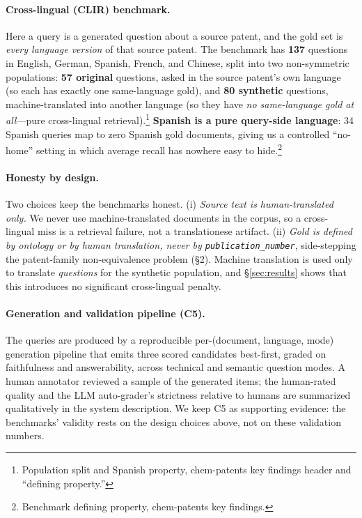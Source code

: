 \documentclass[11pt]{article}
\begin{document}
\paragraph{Cross-lingual (CLIR) benchmark.}
Here a query is a generated question about a source patent, and the gold set is
\emph{every language version} of that source patent. The benchmark has
\textbf{137} questions in English, German, Spanish, French, and Chinese, split
into two non-symmetric populations: \textbf{57 original} questions, asked in the
source patent's own language (so each has exactly one same-language gold), and
\textbf{80 synthetic} questions, machine-translated into another language (so
they have \emph{no same-language gold at all}---pure cross-lingual
retrieval).\footnote{Population split and Spanish property, chem-patents key
findings header and ``defining property.''} \textbf{Spanish is a pure
query-side language}: 34 Spanish queries map to zero Spanish gold documents,
giving us a controlled ``no-home'' setting in which average recall has nowhere
easy to hide.\footnote{Benchmark defining property, chem-patents key findings.}

\paragraph{Honesty by design.}
Two choices keep the benchmarks honest. (i) \emph{Source text is
human-translated only.} We never use machine-translated documents in the
corpus, so a cross-lingual miss is a retrieval failure, not a translationese
artifact. (ii) \emph{Gold is defined by ontology or by human translation, never
by \texttt{publication\_number}}, side-stepping the patent-family
non-equivalence problem (\S2). Machine translation is used only to translate
\emph{questions} for the synthetic population, and \S\ref{sec:results} shows
that this introduces no significant cross-lingual penalty.

\paragraph{Generation and validation pipeline (C5).}
The queries are produced by a reproducible per-(document, language, mode)
generation pipeline that emits three scored candidates best-first, graded on
faithfulness and answerability, across technical and semantic question modes. A
human annotator reviewed a sample of the generated items; the human-rated
quality and the LLM auto-grader's strictness relative to humans are summarized
qualitatively in the system description. We keep C5 as supporting evidence: the
benchmarks' validity rests on the design choices above, not on these validation
numbers.
\end{document}
